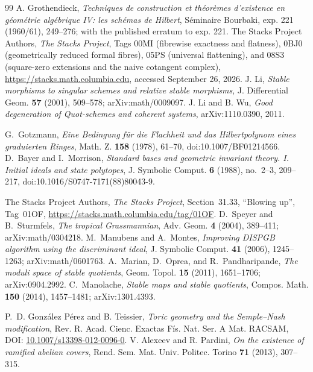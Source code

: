 \documentclass[11pt,reqno]{amsart}
\numberwithin{equation}{section}
\theoremstyle{definition}\newtheorem{definition}[theorem]{Definition}
\theoremstyle{remark}\newtheorem{remark}[theorem]{Remark}
\begin{document}
\begin{thebibliography}{99}
A. Grothendieck, \emph{Techniques de construction et th\'eor\`emes
d'existence en g\'eom\'etrie alg\'ebrique IV: les sch\'emas de Hilbert},
S\'eminaire Bourbaki, exp. 221 (1960/61), 249--276; with the published
erratum to exp. 221.
The Stacks Project Authors, \emph{The Stacks Project},
Tags 00MI (fibrewise exactness and flatness), 0BJ0 (geometrically
reduced formal fibres), 05PS (universal flattening), and 08S3
(square-zero extensions and the naive cotangent complex),
\url{https://stacks.math.columbia.edu}, accessed September 26, 2026.
J. Li, \emph{Stable morphisms to singular schemes and relative
stable morphisms}, J. Differential Geom. \textbf{57} (2001),
509--578; arXiv:math/0009097.
J. Li and B. Wu, \emph{Good degeneration of Quot-schemes and
coherent systems}, arXiv:1110.0390, 2011.


G.~Gotzmann, \emph{Eine Bedingung f\"ur die Flachheit und das
Hilbertpolynom eines graduierten Ringes}, Math. Z. \textbf{158}
(1978), 61--70, doi:10.1007/BF01214566.
D.~Bayer and I.~Morrison, \emph{Standard bases and geometric invariant
theory. I. Initial ideals and state polytopes}, J. Symbolic Comput.
\textbf{6} (1988), no.~2--3, 209--217,
doi:10.1016/S0747-7171(88)80043-9.


The Stacks Project Authors, \emph{The Stacks Project},
Section~31.33, ``Blowing up'', Tag~01OF,
\url{https://stacks.math.columbia.edu/tag/01OF}.
D.~Speyer and B.~Sturmfels, \emph{The tropical Grassmannian},
Adv. Geom. \textbf{4} (2004), 389--411;
arXiv:math/0304218.
M.~Manubens and A.~Montes, \emph{Improving DISPGB algorithm using
the discriminant ideal}, J. Symbolic Comput. \textbf{41} (2006),
1245--1263; arXiv:math/0601763.
A.~Marian, D.~Oprea, and R.~Pandharipande,
\emph{The moduli space of stable quotients}, Geom. Topol.
\textbf{15} (2011), 1651--1706; arXiv:0904.2992.
C.~Manolache, \emph{Stable maps and stable quotients},
Compos. Math. \textbf{150} (2014), 1457--1481; arXiv:1301.4393.


P.~D. Gonz\'alez P\'erez and B. Teissier,
\emph{Toric geometry and the Semple--Nash modification},
Rev. R. Acad. Cienc. Exactas F\'is. Nat. Ser. A Mat. RACSAM,
DOI: \href{https://doi.org/10.1007/s13398-012-0096-0}{10.1007/s13398-012-0096-0}.
V. Alexeev and R. Pardini,
\emph{On the existence of ramified abelian covers},
Rend. Sem. Mat. Univ. Politec. Torino \textbf{71} (2013), 307--315.

\end{thebibliography}
\end{document}
